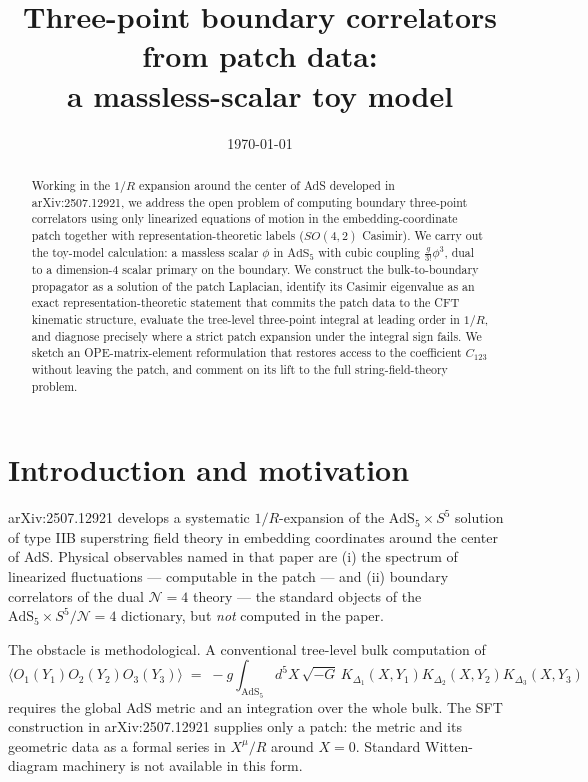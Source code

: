 \documentclass[11pt]{article}
\title{Three-point boundary correlators from patch data:\\ a massless-scalar toy model}
\author{}
\date{\today}
\newcommand{\AdS}{\mathrm{AdS}_5\times S^5}
\newcommand{\AdSf}{\mathrm{AdS}_5}
\newcommand{\CFT}{\mathcal{N}{=}4}
\newcommand{\Dims}[1]{\Delta_{#1}}
\begin{document}
\maketitle

\begin{abstract}
Working in the $1/R$ expansion around the center of AdS developed in arXiv:2507.12921, we address the open problem of computing boundary three-point correlators using only linearized equations of motion in the embedding-coordinate patch together with representation-theoretic labels ($SO(4,2)$ Casimir). We carry out the toy-model calculation: a massless scalar $\phi$ in $\AdSf$ with cubic coupling $\tfrac{g}{3!}\phi^3$, dual to a dimension-$4$ scalar primary on the boundary. We construct the bulk-to-boundary propagator as a solution of the patch Laplacian, identify its Casimir eigenvalue as an exact representation-theoretic statement that commits the patch data to the CFT kinematic structure, evaluate the tree-level three-point integral at leading order in $1/R$, and diagnose precisely where a strict patch expansion under the integral sign fails. We sketch an OPE-matrix-element reformulation that restores access to the coefficient $C_{123}$ without leaving the patch, and comment on its lift to the full string-field-theory problem.
\end{abstract}

\section{Introduction and motivation}

arXiv:2507.12921 develops a systematic $1/R$-expansion of the $\AdS$ solution of type IIB superstring field theory in embedding coordinates around the center of AdS. Physical observables named in that paper are (i) the spectrum of linearized fluctuations --- computable in the patch --- and (ii) boundary correlators of the dual $\CFT$ theory --- the standard objects of the $\AdS/\CFT$ dictionary, but \emph{not} computed in the paper.

The obstacle is methodological. A conventional tree-level bulk computation of
\begin{equation}
\langle O_1(Y_1) O_2(Y_2) O_3(Y_3) \rangle \;=\; -g\int_{\AdSf}\!\! d^5 X\, \sqrt{-G}\, K_{\Dims{1}}(X,Y_1)K_{\Dims{2}}(X,Y_2)K_{\Dims{3}}(X,Y_3)
\label{eq:witten}
\end{equation}
requires the global AdS metric and an integration over the whole bulk. The SFT construction in arXiv:2507.12921 supplies only a patch: the metric and its geometric data as a formal series in $X^\mu / R$ around $X=0$. Standard Witten-diagram machinery is not available in this form.
\end{document}
